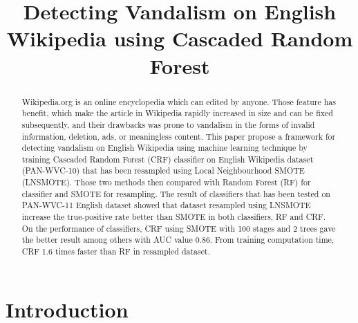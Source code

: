 \documentclass[conference,compsoc,a4paper,twocolumn,final]{IEEEtran}
\begin{document}

\title{Detecting Vandalism on English Wikipedia using Cascaded Random Forest}

\author{%
	\and
}

\maketitle



\begin{abstract}
Wikipedia.org is an online encyclopedia which can edited by anyone.
Those feature has benefit, which make the article in Wikipedia rapidly
increased in size and can be fixed subsequently, and their drawbacks was prone
to vandalism in the forms of invalid information, deletion, ads, or meaningless
content.
This paper propose a framework for detecting vandalism on English Wikipedia
using machine learning technique by training Cascaded Random Forest (CRF)
classifier on English Wikipedia dataset (PAN-WVC-10) that has been resampled
using Local Neighbourhood SMOTE (LNSMOTE).
Those two methods then compared with Random Forest (RF) for classifier and
SMOTE for resampling.
The result of classifiers that has been tested on PAN-WVC-11 English dataset
showed that dataset resampled using LNSMOTE increase the true-positive rate
better than SMOTE in both classifiers, RF and CRF.
On the performance of classifiers, CRF using SMOTE with 100 stages and 2 trees
gave the better result among others with AUC value 0.86.
From training computation time, CRF 1.6 times faster than RF in resampled
dataset.
\end{abstract}



\section{Introduction}
\label{section:introduction}
\end{document}
